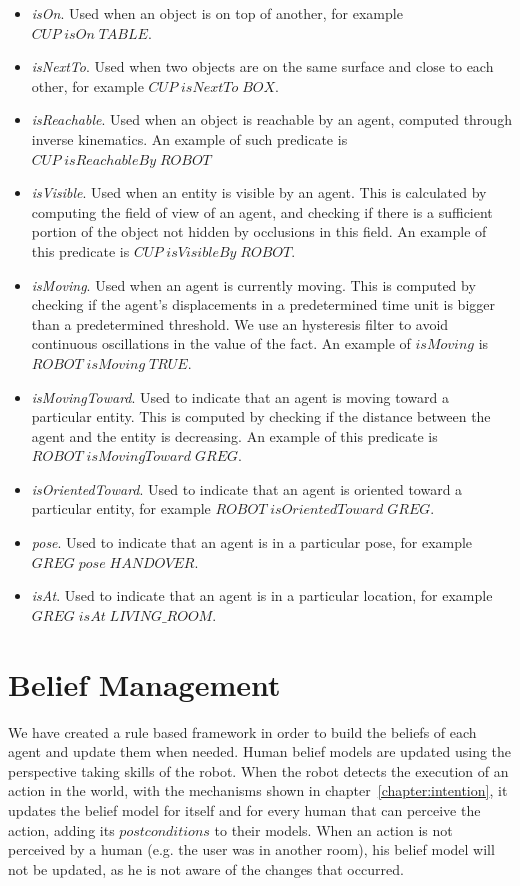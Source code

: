\begin{itemize}
\item \textit{isOn}. Used when an object is on top of another, for example $CUP\; isOn\; TABLE$.
\item \textit{isNextTo}. Used when two objects are on the same surface and close to each other, for example $CUP\; isNextTo\; BOX$.
\item \textit{isReachable}. Used when an object is reachable by an agent, computed through inverse kinematics. An example of such predicate is $CUP\; isReachableBy\; ROBOT$
\item \textit{isVisible}. Used when an entity is visible by an agent. This is calculated by computing the field of view of an agent, and checking if there is a sufficient portion of the object not hidden by occlusions in this field. An example of this predicate is $CUP\; isVisibleBy\; ROBOT$.
\item \textit{isMoving}. Used when an agent is currently moving. This is computed by checking if the agent's displacements in a predetermined time unit is bigger than a predetermined threshold. We use an hysteresis filter to avoid continuous oscillations in the value of the fact. An example of $isMoving$ is $ROBOT\; isMoving\; TRUE$.
\item \textit{isMovingToward}. Used to indicate that an agent is moving toward a particular entity. This is computed by checking if the distance between the agent and the entity is decreasing. An example of this predicate is $ROBOT\; isMovingToward\; GREG$.
\item \textit{isOrientedToward}. Used to indicate that an agent is oriented toward a particular entity, for example $ROBOT\; isOrientedToward\; GREG$.
\item \textit{pose}. Used to indicate that an agent is in a particular pose, for example $GREG\; pose\; HANDOVER$.
\item \textit{isAt}. Used to indicate that an agent is in a particular location, for example \\ $GREG\; isAt\; LIVING\_ROOM$.
\end{itemize}


\section{Belief Management}
\label{sec:belief_management-belief_management}
We have created a rule based framework in order to build the beliefs of each agent and update them when needed. Human belief models are updated using the perspective taking skills of the robot. When the robot detects the execution of an action in the world, with the mechanisms shown in chapter~\ref{chapter:intention},
it updates the belief model for itself and for every human that can perceive the action, adding its $postconditions$ to their models. When an action is not perceived by a human (e.g. the user was in another room), his belief model will not be updated, as he is not aware of the changes that occurred.

